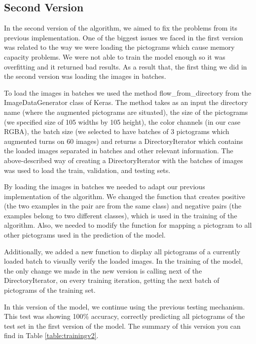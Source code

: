 \subsection{Second Version}
\label{Second Iteration of the One-shot model}

In the second version of the algorithm, we aimed to fix the problems from its previous implementation. One of the biggest issues we faced in the first version was related to the way we were loading the pictograms which cause memory capacity problems. We were not able to train the model enough so it was overfitting and it returned bad results. As a result that, the first thing we did in the second version was loading the images in batches.

To load the images in batches we used the method flow\_from\_directory from the ImageDataGenerator class of Keras. The method takes as an input the directory name (where the augmented pictograms are situated), the size of the pictograms (we specified size of 105 widths by 105 height), the color channels (in our case RGBA), the batch size (we selected to have batches of 3 pictograms which augmented turns on 60 images) and returns a DirectoryIterator which contains the loaded images separated in batches and other relevant information. The above-described way of creating a DirectoryIterator with the batches of images was used to load the train, validation, and testing sets.

By loading the images in batches we needed to adapt our previous implementation of the algorithm. We changed the function that creates positive (the two examples in the pair are from the same class) and negative pairs (the examples belong to two different classes), which is used in the training of the algorithm. Also, we needed to modify the function for mapping a pictogram to all other pictograms used in the prediction of the model.

Additionally, we added a new function to display all pictograms of a currently loaded batch to visually verify the loaded images.
In the training of the model, the only change we made in the new version is calling next of the DirectoryIterator, on every training iteration, getting the next batch of pictograms of the training set.

In this version of the model, we continue using the previous testing mechanism. This test was showing 100\% accuracy, correctly predicting all pictograms of the test set in the first version of the model. The summary of this version you can find in Table \ref{table:trainingv2}. 

